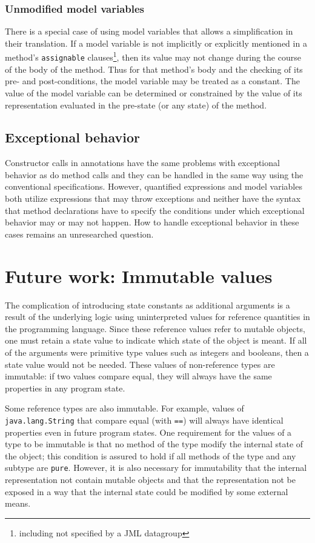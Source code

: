\documentclass{sig-alternate2}
\begin{document}
\subsubsection{Unmodified model variables}

There is a special case of using model variables that allows a simplification in their translation.
If a model variable is not implicitly or explicitly mentioned in a
method's \texttt{assignable} clauses\footnote{including not specified by a JML datagroup}, then its value may not change during the course of the
body of the method.  Thus for that method's body and the checking of its pre- and
post-conditions, the model variable may be treated as a constant.  The value of the model 
variable can be determined or 
constrained by the value of its representation evaluated in the pre-state
(or any state) of the method.

\subsection{Exceptional behavior}

Constructor calls in annotations have the same problems with exceptional behavior as do
method calls and they can be handled in the same way using the conventional specifications.
However, quantified expressions and model variables both utilize expressions that may
throw exceptions and neither have the syntax that method declarations have to 
specify the conditions under which exceptional behavior may or may not happen.  How to
handle exceptional behavior in these cases remains
an unresearched question.

\section{Future work: Immutable values}

The complication of introducing state constants as additional arguments is a result of the underlying logic using uninterpreted values for reference quantities in the programming language.
Since these reference values refer to mutable objects, one must retain a state value to 
indicate which state of the object is meant.  If all of the arguments were primitive type values
such as integers and booleans, then a state value would not be needed.  These values of
non-reference types are immutable: if two values compare equal, they will always have the same
properties in any program state. 

Some reference types are also immutable.  For example, values of \texttt{java.lang.String} that
compare equal (with \texttt{==}) will always have identical properties even in future program
states.  One requirement for the values of a type to be immutable is that no method of the type
modify the internal state of the object; this condition is assured to hold if all methods of the 
type and any subtype are
\texttt{pure}.  However, it is also 
necessary for immutability
that the internal representation not contain mutable objects and
that the representation not be exposed  in a way that the internal state could be modified by 
some external means.
\end{document}
